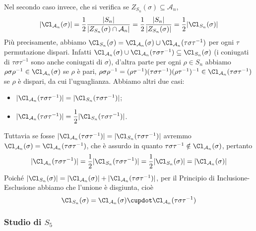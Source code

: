 \documentclass[11pt]{scrartcl}
\begin{document}
Nel secondo caso invece, che si verifica se $Z_{S_n}(\sigma)\subseteq 
\mathcal{A}_n$,
\[
    |\Cl_{\mathcal{A}_n}(\sigma)| = \frac 1 2 \frac{|S_n|}{|Z_{S_n}(\sigma)\cap\mathcal{A}_n|}
    = \frac 1 2 \frac{|S_n|}{|Z_{S_n}(\sigma)|} = \frac 1 2 |\Cl_{S_n}(\sigma)|
\]
Più precisamente, abbiamo $\Cl_{S_n}(\sigma) = \Cl_{\mathcal{A}_n}(\sigma) \cup
\Cl_{\mathcal{A}_n}(\tau\sigma\tau^{-1})$ per ogni $\tau$ permutazione dispari. 
Infatti $\Cl_{\mathcal{A}_n}(\sigma) \cup \Cl_{\mathcal{A}_n}(\tau\sigma\tau^{-1})
\subseteq \Cl_{S_n}(\sigma)$ (i coniugati di $\tau\sigma\tau^{-1}$ sono anche
coniugati di $\sigma$), d'altra parte per ogni $\rho \in S_n$ abbiamo
$\rho\sigma\rho^{-1} \in \Cl_{\mathcal{A}_n}(\sigma)$ se $\rho$ è pari,
$\rho\sigma\rho^{-1} = (\rho\tau^{-1})(\tau\sigma\tau^{-1})(\rho\tau^{-1})^{-1}
\in \Cl_{\mathcal{A}_n}(\tau\sigma\tau^{-1})$ se $\rho$ è dispari, da cui l'uguaglianza.
Abbiamo altri due casi:
\begin{itemize}
    \item $|\Cl_{\mathcal{A}_n}(\tau\sigma\tau^{-1})| = |\Cl_{S_n}(\tau\sigma\tau^{-1})|$;
    \item $|\Cl_{\mathcal{A}_n}(\tau\sigma\tau^{-1})| = \displaystyle\frac 1 2
    |\Cl_{S_n}(\tau\sigma\tau^{-1})|$.
\end{itemize}
Tuttavia se fosse $|\Cl_{\mathcal{A}_n}(\tau\sigma\tau^{-1})| = |\Cl_{S_n}(\tau\sigma\tau^{-1})|$
avremmo $\Cl_{\mathcal{A}_n}(\sigma) = \Cl_{\mathcal{A}_n}(\tau\sigma\tau^{-1})$,
che è assurdo in quanto $\tau\sigma\tau^{-1} \notin \Cl_{\mathcal{A}_n}(\sigma)$,
pertanto \[
    |\Cl_{\mathcal{A}_n}(\tau\sigma\tau^{-1})| = \displaystyle\frac 1 2
    |\Cl_{S_n}(\tau\sigma\tau^{-1})| = \frac 1 2|\Cl_{S_n}(\sigma)| =
    |\Cl_{\mathcal{A}_n}(\sigma)|
\]
Poiché 
$|\Cl_{S_n}(\sigma)| = |\Cl_{\mathcal{A}_n}(\sigma)| + |\Cl_{\mathcal{A}_n}(\tau\sigma\tau^{-1})|$,
per il Principio di Inclusione-Esclusione abbiamo che l'unione è disgiunta,
cioè
\[
    \Cl_{S_n}(\sigma) = \Cl_{\mathcal{A}_n}(\sigma) \cupdot \Cl_{\mathcal{A}_n}(\tau\sigma\tau^{-1})
\]

\subsubsection{Studio di $S_5$}
\end{document}
